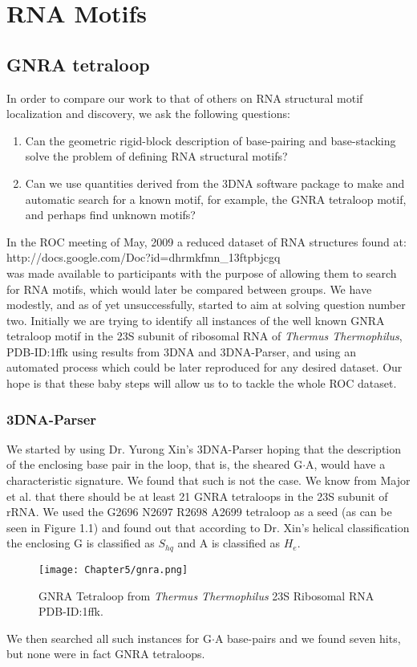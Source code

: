 \chapter{RNA Motifs}
\label{motifs} 


\section{GNRA tetraloop}
In order to compare our work to that of others on RNA structural motif
localization and discovery, we ask the following questions:
\begin{enumerate}
\item{Can  the geometric rigid-block  description of  base-pairing and
  base-stacking solve the problem of defining RNA structural motifs?}
\item{Can we use quantities derived  from the 3DNA software package to
  make and automatic  search for a known motif,  for example, the GNRA
  tetraloop motif, and perhaps find unknown motifs?}
\end{enumerate}
In the  ROC meeting of May,  2009 a reduced dataset  of RNA structures
found  at:\\  http://docs.google.com/Doc?id=dhrmkfmn\_13ftpbjcgq\\ was
made available  to participants with  the purpose of allowing  them to
search for RNA motifs, which would later be compared between groups.
We  have modestly, and  as of  yet unsuccessfully,  started to  aim at
solving question number  two. Initially we are trying  to identify all
instances of the well known GNRA tetraloop motif in the 23S subunit of
ribosomal  RNA  of  \textit{Thermus Thermophilus},  PDB-ID:1ffk  using
results  from 3DNA  and 3DNA-Parser,  and using  an  automated process
which could be later reproduced  for any desired dataset.  Our hope is
that  these baby  steps  will allow  us  to to  tackle  the whole  ROC
dataset.

\subsection{3DNA-Parser}
We started by using Dr. Yurong Xin's 3DNA-Parser hoping that the
description of the enclosing base pair in the loop, that is, the
sheared G$\cdot$A, would have a characteristic signature.
We found that such is not the case. We know from Major et
al. \cite{lemieux2006} that there should be at least 21 GNRA tetraloops
in the 23S subunit of rRNA. We used the G2696 N2697 R2698 A2699
tetraloop as a seed (as can be seen in Figure 1.1) and found out
that according to Dr. Xin's helical classification the enclosing G is
classified as $S_{hq}$ and A is classified as $H_{e}$. 
\begin{figure}[htbp]
\centering 
\texttt{[image: Chapter5/gnra.png]}
\caption{GNRA Tetraloop from \textit{Thermus Thermophilus} 23S Ribosomal RNA PDB-ID:1ffk.}
\end{figure}
We then searched all such instances for G$\cdot$A base-pairs and we found seven hits,
but none were in fact GNRA tetraloops.

